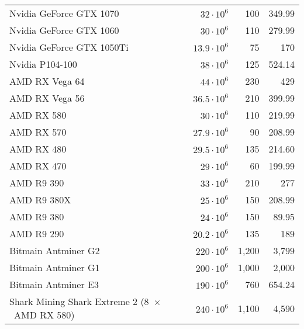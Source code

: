 \begin{longtable}{|p{}|r|r|r|}
  Nvidia GeForce GTX 1070                                             & $ 32 \cdot 10^6$ & 100 & 349.99 \\
  Nvidia GeForce GTX 1060                                             & $ 30 \cdot 10^6$ & 110 & 279.99 \\
  Nvidia GeForce GTX 1050Ti                                           & $ 13.9 \cdot 10^6$ & 75 & 170 \\
  Nvidia P104-100                                                     & $ 38 \cdot 10^6$ & 125 & 524.14 \\
  AMD RX Vega 64                                                      & $ 44 \cdot 10^6$ & 230 & 429 \\
  AMD RX Vega 56                                                      & $ 36.5 \cdot 10^6$ & 210 & 399.99 \\
  AMD RX 580                                                          & $ 30 \cdot 10^6$ & 110 & 219.99 \\
  AMD RX 570                                                          & $ 27.9 \cdot 10^6$ & 90 & 208.99 \\
  AMD RX 480                                                          & $ 29.5 \cdot 10^6$ & 135 & 214.60 \\
  AMD RX 470                                                          & $ 29 \cdot 10^6$ & 60 & 199.99 \\
  AMD R9 390                                                          & $ 33 \cdot 10^6$ & 210 & 277 \\
  AMD R9 380X                                                         & $ 25 \cdot 10^6$ & 150 & 208.99 \\
  AMD R9 380                                                          & $ 24 \cdot 10^6$ & 150 & 89.95 \\
  AMD R9 290                                                          & $ 20.2 \cdot 10^6$ & 135 & 189 \\
  Bitmain Antminer G2                                                 & $220 \cdot 10^6$ & 1,200 & 3,799 \\
  Bitmain Antminer G1                                                 & $200 \cdot 10^6$ & 1,000 & 2,000 \\
  Bitmain Antminer E3                                                 & $190 \cdot 10^6$ & 760 & 654.24 \\
  Shark Mining Shark Extreme 2 (8~$\times$~AMD RX 580)                & $240 \cdot 10^6$ & 1,100 & 4,590 \\

\end{longtable}
